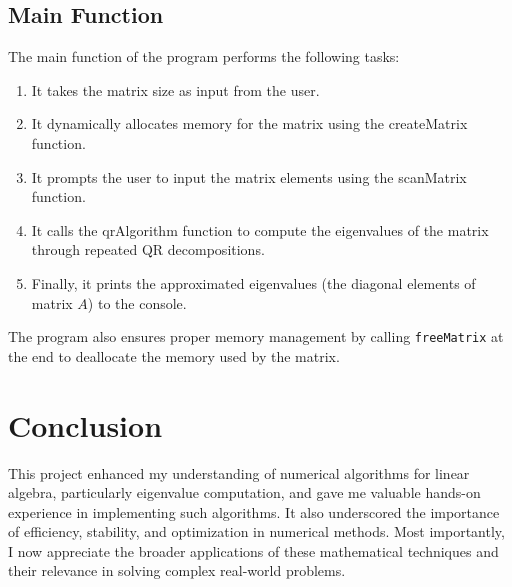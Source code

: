 \documentclass[journal]{IEEEtran}
\begin{document}
\subsection*{Main Function}
The main function of the program performs the following tasks:
\begin{enumerate}
\item  It takes the matrix size as input from the user.
\item It dynamically allocates memory for the matrix using the createMatrix function.
\item It prompts the user to input the matrix elements using the scanMatrix function.
\item It calls the qrAlgorithm function to compute the eigenvalues of the matrix through repeated QR decompositions.
\item Finally, it prints the approximated eigenvalues (the diagonal elements of matrix \( A \)) to the console.
\end{enumerate}

The program also ensures proper memory management by calling \texttt{freeMatrix} at the end to deallocate the memory used by the matrix.

\section{Conclusion}
This project enhanced my understanding of numerical algorithms for linear algebra, particularly eigenvalue computation, and gave me valuable hands-on experience in implementing such algorithms. It also underscored the importance of efficiency, stability, and optimization in numerical methods. Most importantly, I now appreciate the broader applications of these mathematical techniques and their relevance in solving complex real-world problems.
\end{document}
